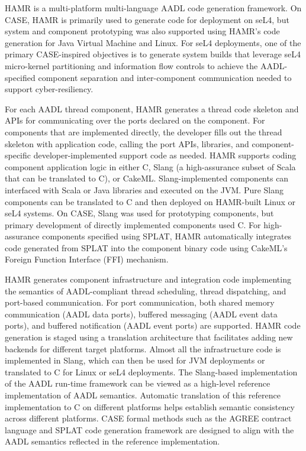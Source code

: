 
HAMR is a multi-platform multi-language AADL code generation framework.  On CASE, HAMR is primarily used to generate code for deployment on seL4, but system and component prototyping was also supported using HAMR's code generation for Java Virtual Machine and Linux.  For seL4 deployments, one of the primary CASE-inspired objectives is to generate system builds that leverage seL4 micro-kernel partitioning and information flow controls to achieve the AADL-specified component separation and inter-component communication needed to support cyber-resiliency.

For each AADL thread component, HAMR generates a thread code skeleton and APIs for communicating over the ports declared on the component.  For components that are implemented directly, the developer fills out the thread skeleton with application code, calling the port APIs, libraries, and component-specific developer-implemented support code as needed.  HAMR supports coding component application logic in either C, Slang (a high-assurance subset of Scala that can be translated to C), or CakeML.  Slang-implemented components can interfaced with Scala or Java libraries and executed on the JVM.  Pure Slang components can be translated to C and then deployed on HAMR-built Linux or seL4 systems.  On CASE, Slang was used for prototyping components, but primary development of directly implemented components used C.  For high-assurance components specified using SPLAT, HAMR automatically integrates code generated from SPLAT into the component binary code using CakeML's Foreign Function Interface (FFI) mechanism.

HAMR generates component infrastructure and integration code implementing the semantics of AADL-compliant thread scheduling, thread dispatching, and port-based communication.  For port communication, both shared memory communication (AADL data ports), buffered messaging (AADL event data ports), and buffered notification (AADL event ports) are supported.  HAMR code generation is staged using a translation architecture that facilitates adding new backends for different target platforms.   Almost all the infrastructure code is implemented in Slang, which can then be used for JVM deployments or translated to C for Linux or seL4 deployments.  The Slang-based implementation of the AADL run-time framework can be viewed as a high-level reference implementation of AADL semantics.   Automatic translation of this reference implementation to C on different platforms helps establish semantic consistency across different platforms.    CASE formal methods such as the AGREE contract language and SPLAT code generation framework are designed to align with the AADL semantics reflected in the reference implementation.  

